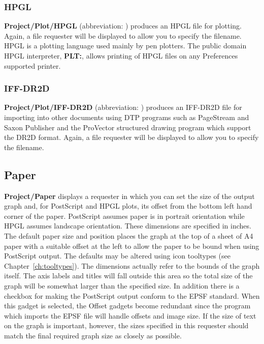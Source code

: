 \subsubsection{HPGL}
{\bf Project/Plot/HPGL} (abbreviation: ) 
produces an HPGL file for plotting. Again, a file requester will 
be displayed to allow you to specify the filename. HPGL is a plotting language used 
mainly by pen plotters. The public domain HPGL interpreter, {\bf PLT:}, allows 
printing of HPGL files on any Preferences supported printer.
\subsubsection{IFF-DR2D}
{\bf Project/Plot/IFF-DR2D} (abbreviation: ) 
produces an IFF-DR2D file for importing into other documents using DTP programs 
such as PageStream and Saxon Publisher and the ProVector structured drawing program
which support the DR2D format.
Again, a file requester will be displayed to allow you to specify the filename. 


\subsection{Paper}
{\bf Project/Paper} displays a requester in which you can set 
the size of the output graph and, for PostScript and HPGL plots, its offset 
from the bottom left hand corner of the paper. PostScript assumes paper is in 
portrait orientation while HPGL assumes landscape orientation. These 
dimensions are specified in inches. The default paper size and position places 
the graph at the top of a sheet of A4 paper with a suitable offset at the left to 
allow the paper to be bound when using PostScript output. The defaults may be altered 
using icon tooltypes (see Chapter~\ref{ch:tooltypes}).
The dimensions actually refer to the bounds of the 
graph itself. The axis labels and titles will fall outside this area so the total 
size of the graph will be somewhat larger than the specified size.
In addition there is a checkbox for making the PostScript output conform to the
EPSF standard. When this gadget is selected, the Offset gadgets become 
redundant since the program which imports the EPSF file will handle offsets and image 
size. If the size of text on the graph is important, however, the sizes specified 
in this requester should match the final required graph size as closely as possible.


